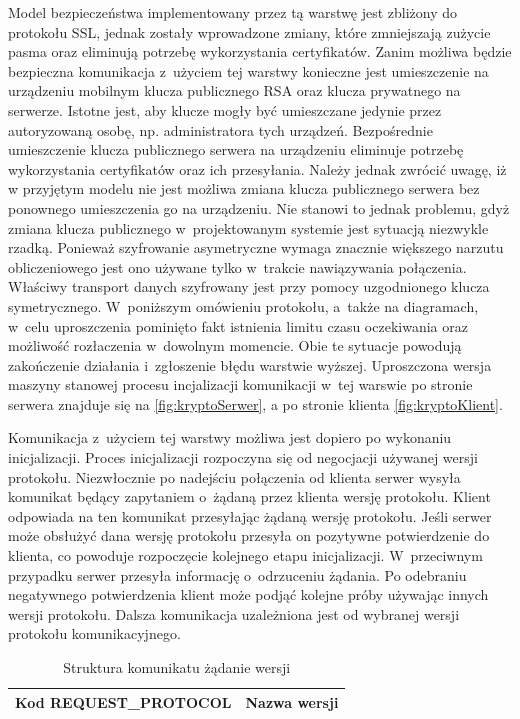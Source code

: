 Model bezpieczeństwa implementowany przez tą warstwę jest zbliżony do
protokołu SSL, jednak zostały wprowadzone zmiany, które zmniejszają
zużycie pasma oraz eliminują potrzebę wykorzystania
certyfikatów. Zanim możliwa będzie bezpieczna komunikacja z~użyciem
tej warstwy konieczne jest umieszczenie na urządzeniu mobilnym klucza
publicznego RSA oraz klucza prywatnego na serwerze. Istotne jest, aby
klucze mogły być umieszczane jedynie przez autoryzowaną osobę,
np. administratora tych urządzeń. Bezpośrednie umieszczenie klucza
publicznego serwera na urządzeniu eliminuje potrzebę wykorzystania
certyfikatów oraz ich przesyłania. Należy jednak zwrócić uwagę, iż w
przyjętym modelu nie jest możliwa zmiana klucza publicznego serwera
bez ponownego umieszczenia go na urządzeniu. Nie stanowi to jednak
problemu, gdyż zmiana klucza publicznego w~projektowanym systemie jest
sytuacją niezwykle rzadką. Ponieważ szyfrowanie asymetryczne wymaga
znacznie większego narzutu obliczeniowego jest ono używane tylko
w~trakcie nawiązywania połączenia. Właściwy transport danych
szyfrowany jest przy pomocy uzgodnionego klucza
symetrycznego. W~poniższym omówieniu protokołu, a~także na diagramach,
w~celu uproszczenia pominięto fakt istnienia limitu czasu oczekiwania
oraz możliwość rozłaczenia w~dowolnym momencie. Obie te sytuacje
powodują zakończenie działania i~zgłoszenie błędu warstwie
wyższej. Uproszczona wersja maszyny stanowej procesu incjalizacji
komunikacji w~tej warswie po stronie serwera znajduje się na
\ref{fig:kryptoSerwer}, a po stronie klienta \ref{fig:kryptoKlient}.



Komunikacja z~użyciem tej warstwy możliwa jest dopiero po wykonaniu
inicjalizacji. Proces inicjalizacji rozpoczyna się od negocjacji
używanej wersji protokołu. Niezwłocznie po nadejściu połączenia od
klienta serwer wysyła komunikat będący zapytaniem o~żądaną przez
klienta wersję protokołu. Klient odpowiada na ten komunikat
przesyłając żądaną wersję protokołu. Jeśli serwer może obsłużyć dana
wersję protokołu przesyła on pozytywne potwierdzenie do klienta, co
powoduje rozpoczęcie kolejnego etapu inicjalizacji. W~przeciwnym
przypadku serwer przesyła informację o~odrzuceniu żądania. Po
odebraniu negatywnego potwierdzenia klient może podjąć kolejne próby
używając innych wersji protokołu. Dalsza komunikacja uzależniona jest
od wybranej wersji protokołu komunikacyjnego.

\begin{table}[H]
\centering
\caption{Struktura komunikatu żądanie wersji}

\begin{tabular}{|p{5cm}|p{6cm}|}
\hline
\raggedright{Kod REQUEST\_PROTOCOL} & Nazwa wersji\\
\hline
\end{tabular}
\end{table}

